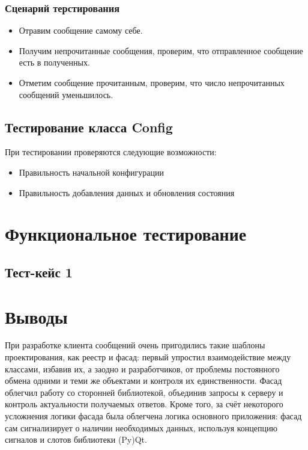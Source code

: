\documentclass[12pt]{article}
\begin{document}
\subsubsection{Сценарий терстирования}
\begin{itemize}
\setlength{\itemsep}{-1mm}
\item Отравим сообщение самому себе.
\item Получим непрочитанные сообщения, проверим, что отправленное сообщение есть в полученных.
\item Отметим сообщение прочитанным, проверим, что число непрочитанных сообщений уменьшилось.
\end{itemize}

\subsection{Тестирование класса Config}
При тестировании проверяются следующие возможности:
\begin{itemize}
\setlength{\itemsep}{-1mm}
\item Правильность начальной конфигурации
\item Правильность добавления данных и обновления состояния
\end{itemize}


\newpage
\section{Функциональное тестирование}
\subsection{Тест-кейс 1}




\newpage
\section{Выводы}
\indent При разработке клиента сообщений очень пригодились такие шаблоны проектирования, как реестр и фасад: первый упростил взаимодействие между классами, избавив их, а заодно и разработчиков, от проблемы постоянного обмена одними и теми же объектами и контроля их единственности. Фасад облегчил работу со сторонней библиотекой, объединив запросы к серверу и контроль актуальности получаемых ответов. Кроме того, за счёт некоторого усложнения логики фасада была облегчена логика основного приложения: фасад сам сигнализирует о наличии необходимых данных, используя концепцию сигналов и слотов библиотеки (Py)Qt. \newline
\end{document}
